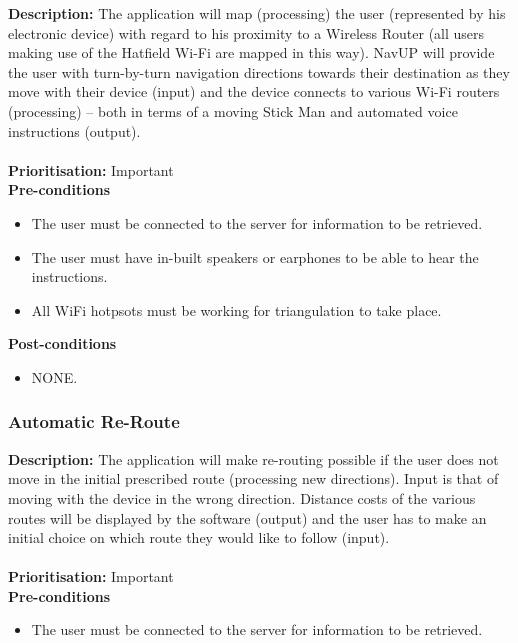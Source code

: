 \documentclass[runningheads,a4paper]{article}
\begin{document}
\textbf{Description:}  The application will map (processing) the user (represented by his electronic device) with regard to his proximity to a Wireless Router (all users making use of the Hatfield Wi-Fi are mapped in this way). NavUP will provide the user with turn-by-turn navigation directions towards their destination as they move with their device (input) and the device connects to various Wi-Fi routers (processing) – both in terms of a moving Stick Man and automated voice instructions (output).\\\\
\noindent
\textbf{Prioritisation:} Important\\
  
  
\textbf{Pre-conditions}
\begin{itemize}
	\item The user must be connected to the server for information to be retrieved.
	\item The user must have in-built speakers or earphones to be able to hear the instructions.
	\item All WiFi hotpsots must be working for triangulation to take place.
\end{itemize}
  
\textbf{Post-conditions}
\begin{itemize}
  	\item NONE.
\end{itemize}

\subsubsection{Automatic Re-Route}

\textbf{Description:}  The application will make re-routing possible if the user does not move in the initial prescribed route (processing new directions). Input is that of moving with the device in the wrong direction. Distance costs of the various routes will be displayed by the software (output) and the user has to make an initial choice on which route they would like to follow (input).\\\\
\noindent
\textbf{Prioritisation:} Important\\
  
  
\textbf{Pre-conditions}
\begin{itemize}
	\item The user must be connected to the server for information to be retrieved.
\end{itemize}
  
\end{document}
